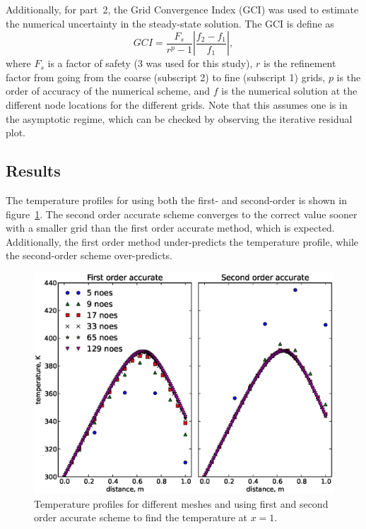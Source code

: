 \documentclass[11pt, letterpaper]{article}
\newcommand{\fig}[1]{figure~\ref{#1}}
\begin{document}
Additionally, for part~2, the Grid Convergence Index (GCI) was used to estimate
the numerical uncertainty in the steady-state solution.  The GCI is define as
%
\begin{equation}
	\label{eqn:gci}
	GCI = \frac{F_s}{r^p - 1} \left| \frac{f_2 - f_1}{f_1} \right|,
\end{equation}
%
where $F_s$ is a factor of safety (3 was used for this study), $r$ is the refinement
factor from going from the coarse (subscript 2) to fine (subscript 1) grids, $p$ is
the order of accuracy of the numerical scheme, and $f$ is the numerical solution at
the different node locations for the different grids.  Note that this assumes one
is in the asymptotic regime, which can be checked by observing the iterative
residual plot.


\subsection{Results}

The temperature profiles for using both the first- and second-order is shown
in \fig{fig:p2_profiles}.  The second order accurate scheme converges to the
correct value sooner with a smaller grid than the first order accurate method, which
is expected.  Additionally, the first order method under-predicts the temperature
profile, while the second-order scheme over-predicts.

\begin{figure}
	\centering
	\includegraphics[width=4.5in]{./figs/p2_profiles.eps}
	\caption{Temperature profiles for different meshes and using first and
		second order accurate scheme to find the temperature at $x=1$.}
	\label{fig:p2_profiles}
\end{figure}
\end{document}
